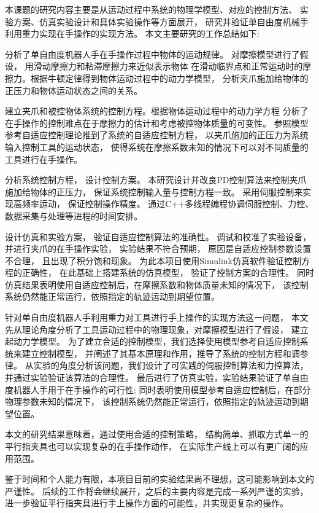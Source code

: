 
\conclusion
本课题的研究内容主要是从运动过程中系统的物理学模型、对应的控制方法、
实验方案、仿真实验设计和具体实验操作等方面展开，
研究并验证单自由度机械手利用重力实现在手操作的实现方法。
本文主要研究的工作总结如下:

\begin{listNormal}
  \item 分析了单自由度机器人手在手操作过程中物体的运动规律。
    对摩擦模型进行了假设， 用滑动摩擦力和粘滞摩擦力来近似表示物体
    在滑动临界点和正常运动时的摩擦力。根据牛顿定律得到物体运动过程中的动力学模型，
    分析夹爪施加给物体的正压力和物体运动状态之间的关系。
  \item 建立夹爪和被控物体系统的控制方程。根据物体运动过程中的动力学方程
    分析了在手操作的控制难点在于摩擦力的估计和考虑被控物体质量的可变性。
    参照模型参考自适应控制理论推到了系统的自适应控制方程，
    以夹爪施加的正压力为系统输入控制工具的运动状态，
    使得系统在摩擦系数未知的情况下可以对不同质量的工具进行在手操作。
  \item 分析系统控制方程， 设计控制方案。
    本研究设计并改良PD控制算法来控制夹爪施加给物体的正压力，
    保证系统控制输入量与控制方程一致。
    采用伺服控制来实现高频率运动， 保证控制操作精度。
    通过C++多线程编程协调伺服控制、力控、数据采集与处理等进程的时间安排。
  \item 设计仿真和实验方案， 验证自适应控制算法的准确性。
    调试和校准了实验设备， 并进行夹爪的在手操作实验， 实验结果不符合预期，
    原因是自适应控制参数设置不合理， 且出现了积分饱和现象。
    为此本项目使用Simulink仿真软件验证控制方程的正确性， 在此基础上搭建系统的仿真模型，
    验证了控制方案的合理性。
    同时仿真结果表明使用自适应控制后，在摩擦系数和物体质量未知的情况下，
    该控制系统仍然能正常运行，依照指定的轨迹运动到期望位置。
\end{listNormal}

针对单自由度机器人手利用重力对工具进行手上操作的实现方法这一问题，
本文先从理论角度分析了工具运动过程中的物理现象，对摩擦模型进行了假设，
建立起动力学模型。
为了建立合适的控制模型，我们选择使用模型参考自适应控制系统来建立控制模型，
并阐述了其基本原理和作用，推导了系统的控制方程和调参律。
从实验的角度分析该问题，我们设计了可实践的伺服控制算法和力控算法，
并通过实验验证该算法的合理性。
最后进行了仿真实验，实验结果验证了单自由度机器人手用于在手操作的可行性;
同时表明使用模型参考自适应控制后，在部分物理参数未知的情况下，
该控制系统仍然能正常运行，依照指定的轨迹运动到期望位置。

本文的研究结果意味着，通过使用合适的控制策略，
结构简单、抓取方式单一的平行指夹具也可以实现复杂的在手操作动作，
在实际生产线上可以有更广阔的应用范围。

鉴于时间和个人能力有限，本项目目前的实验结果尚不理想，这可能影响到本文的严谨性。
后续的工作将会继续展开，之后的主要内容是完成一系列严谨的实验，
进一步验证平行指夹具进行手上操作方面的可能性，并实现更复杂的操作。

